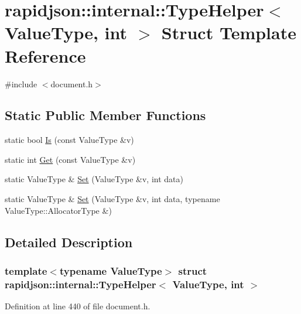 \hypertarget{structrapidjson_1_1internal_1_1_type_helper_3_01_value_type_00_01int_01_4}{}\section{rapidjson\+::internal\+::Type\+Helper$<$ Value\+Type, int $>$ Struct Template Reference}
\label{structrapidjson_1_1internal_1_1_type_helper_3_01_value_type_00_01int_01_4}


{\ttfamily \#include $<$document.\+h$>$}

\subsection*{Static Public Member Functions}
\begin{DoxyCompactItemize}
\item 
static bool \mbox{\hyperlink{structrapidjson_1_1internal_1_1_type_helper_3_01_value_type_00_01int_01_4_a6faf9b086ab8884b66dd71d3d99d72de}{Is}} (const Value\+Type \&v)
\item 
static int \mbox{\hyperlink{structrapidjson_1_1internal_1_1_type_helper_3_01_value_type_00_01int_01_4_ab6e3343b4a69e548402dca927569c347}{Get}} (const Value\+Type \&v)
\item 
static Value\+Type \& \mbox{\hyperlink{structrapidjson_1_1internal_1_1_type_helper_3_01_value_type_00_01int_01_4_a662c9fe5a48e36ccaf7db5c56980f6d3}{Set}} (Value\+Type \&v, int data)
\item 
static Value\+Type \& \mbox{\hyperlink{structrapidjson_1_1internal_1_1_type_helper_3_01_value_type_00_01int_01_4_ae9fc7bfa4b6df0f17c38f0a4398bdf9b}{Set}} (Value\+Type \&v, int data, typename Value\+Type\+::\+Allocator\+Type \&)
\end{DoxyCompactItemize}


\subsection{Detailed Description}
\subsubsection*{template$<$typename Value\+Type$>$\newline
struct rapidjson\+::internal\+::\+Type\+Helper$<$ Value\+Type, int $>$}



Definition at line 440 of file document.\+h.



